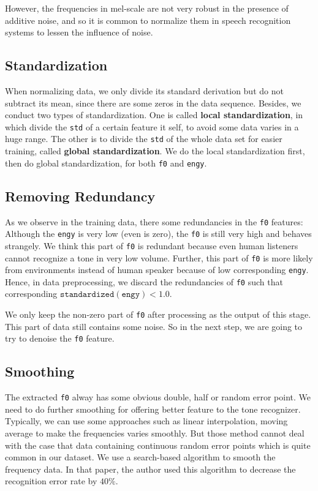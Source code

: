 \documentclass[a4paper]{article}
\begin{document}
However, the frequencies in mel-scale are not very robust in the presence of additive noise, and so it is common to normalize them in speech recognition systems to lessen the influence of noise.
\subsection{Standardization}
When normalizing data, we only divide its standard derivation but do not subtract its mean, since there are some zeros in the data sequence. Besides, we conduct two types of standardization. One is called \textbf{local standardization}, in which divide the \texttt{std} of a certain feature it self, to avoid some data varies in a huge range. The other is to divide the \texttt{std} of the whole data set for easier training, called \textbf{global standardization}. We do the local standardization first, then do global standardization, for both \texttt{f0} and \texttt{engy}.
\subsection{Removing Redundancy}
As we observe in the training data, there some redundancies in the \texttt{f0} features: Although the \texttt{engy} is very low (even is zero), the \texttt{f0} is still very high and behaves strangely. We think this part of \texttt{f0} is redundant because even human listeners cannot recognize a tone in very low volume. Further, this part of \texttt{f0} is more likely from environments instead of human speaker because of low corresponding \texttt{engy}. Hence, in data preprocessing, we discard the redundancies of \texttt{f0} such that corresponding $\mathtt{standardized(engy)} < 1.0$. 

We only keep the non-zero part of \texttt{f0} after processing as the output of this stage. This part of data still contains some noise. So in the next step, we are going to try to denoise the \texttt{f0} feature.

\subsection{Smoothing}
The extracted \texttt{f0} alway has some obvious double, half or random error point. We need to do further smoothing for offering better feature to the tone recognizer. Typically, we can use some approaches such as linear interpolation, moving average to make the frequencies varies smoothly. But those method cannot deal with the case that data containing continuous random error points which is quite common in our dataset. We use a search-based algorithm
	to smooth the frequency data. In that paper, the author used this algorithm to decrease the recognition error rate by $40\%$. 
	
\end{document}
